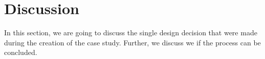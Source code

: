 \section{Discussion}
In this section, we are going to discuss the single design decision that were made during the creation of the case study. Further, we discuss we if the process can be concluded.
